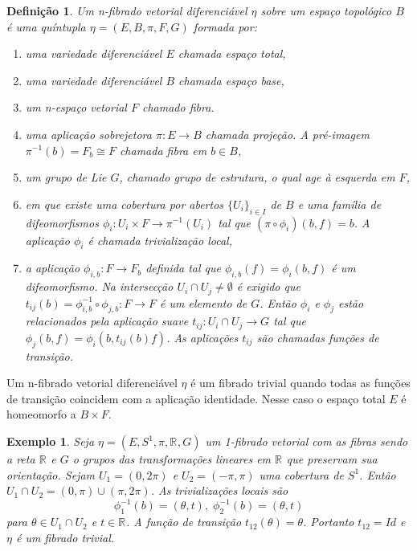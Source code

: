 \documentclass[12pt]{book}
\newtheorem{definicao}[teorema]{Definição}
\newtheorem{exemplo}[teorema]{Exemplo}
\newcommand{\circulo}{S^{1}}
\newcommand{\real}[1]{\mathbb{R}^{#1}}
\newcommand{\reta}{\real{}}
\begin{document}
	\begin{definicao}
		Um n-fibrado vetorial diferenciável $\eta$ sobre um espaço topológico $B$ é uma quíntupla $\eta = (E, B, \pi, F, G)$ formada por:
		
		\begin{enumerate}
			\item uma variedade diferenciável $E$ chamada espaço total,
			
			\item uma variedade diferenciável $B$ chamada espaço base,
			
			\item um n-espaço vetorial $F$ chamado fibra.
			
			\item uma aplicação sobrejetora $\pi: E\to B$ chamada projeção. A pré-imagem $\pi^{-1}(b) = F_{b} \cong F$ chamada fibra em $b\in B$,
			
			\item um grupo de Lie $G$, chamado grupo de estrutura, o qual age à esquerda em $F$,
			
			\item em que existe uma cobertura por abertos $\{U_{i}\}_{i\in I}$ de $B$ e uma família de difeomorfismos $\phi_{i}: U_{i}\times F\to \pi^{-1}(U_{i})$ tal que $(\pi\circ \phi_{i})(b,f) = b$. A aplicação $\phi_{i}$ é chamada trivialização local,
			
			\item a aplicação $\phi_{i,b}: F\to F_{b}$ definida tal que $\phi_{i,b}(f) = \phi_{i}(b,f)$ é um difeomorfismo. Na intersecção $U_{i}\cap U_{j}\neq \emptyset$ é exigido que $t_{ij}(b)=\phi_{i,b}^{-1}\circ \phi_{j,b}:F\to F$ é um elemento de $G$. Então $\phi_{i}$ e $\phi_{j}$ estão relacionados pela aplicação suave $t_{ij}: U_{i}\cap U_{j}\to G$ tal que $\phi_{j}(b, f) = \phi_{i}(b, t_{ij}(b)f)$. As aplicações $t_{ij}$ são chamadas funções de transição.
		\end{enumerate}
		
	\end{definicao}
	
	Um n-fibrado vetorial diferenciável $\eta$ é um fibrado trivial quando todas as funções de transição coincidem com a aplicação identidade. Nesse caso o espaço total $E$ é homeomorfo a $B\times F$.
	
	\begin{exemplo}\label{exemplo_fibrado_circulo}
		Seja $\eta=(E, \circulo,\pi, \reta, G)$ um 1-fibrado vetorial com as fibras sendo a reta $\reta$ e $G$ o grupos das transformações lineares em $\reta$ que preservam sua orientação. Sejam $U_{1} = (0,2\pi)$ e $U_{2} = (-\pi,\pi)$ uma cobertura de $\circulo$. Então $U_{1}\cap U_{2} =(0,\pi)\cup(\pi,2\pi)$. As trivializações locais são 
		$$
		\phi^{-1}_{1}(b) = (\theta, t),\; 		\phi^{-1}_{2}(b) = (\theta, t)
		$$
		para $\theta\in U_{1}\cap U_{2}$ e $t\in \reta$. A função de transição $t_{12}(\theta) = \theta$. Portanto $t_{12}=Id$ e $\eta$ é um fibrado trivial.
	\end{exemplo}
	
\end{document}
